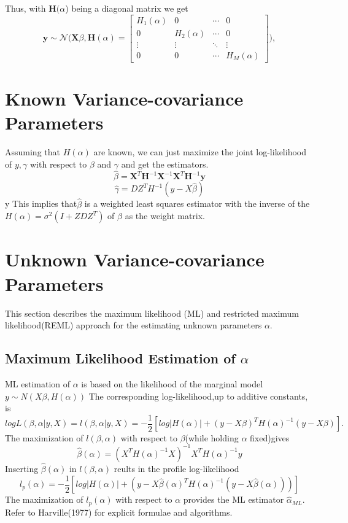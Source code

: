 \documentclass[a4paper,11pt]{article}
\begin{document}
Thus, with $\bm{H}(\alpha$) being a diagonal matrix we get \begin{equation}
	\bm{y}\sim\mathcal{N}\biggl( \bm{X}\beta,\bm{H}(\alpha)= \left[ \begin{array}{cccc}
	H_1(\alpha) & 0 & \cdots & 0 \\
	0 & H_2(\alpha)& \cdots& 0 \\
	\vdots & \vdots & \ddots& \vdots\\
	0 & 0& \cdots & H_M(\alpha) \end{array} \right] \biggr),	
\end{equation}
\section{Known Variance-covariance Parameters}
Assuming that $H(\alpha)$ are known, we can just maximize the joint log-likelihood of $y,\gamma$ with respect to $\beta$ and $\gamma$ and get the estimators.
\begin{equation}
\widehat{\beta}=\bm{X}^T\bm{H}^{-1}\bm{X}^{-1}\bm{X}^T\bm{H}^{-1}\bm{y}
\end{equation}
\begin{equation}
\widehat{\gamma}= DZ^TH^{-1}(y-X\widehat{\beta})
\end{equation}y
This implies that$\widehat{\beta}$ is a weighted least squares estimator with the inverse of the $H(\alpha) = \sigma^2(I+ZDZ^T)$ of $\beta$ as the weight matrix.
\section{Unknown Variance-covariance Parameters}
This section describes the maximum likelihood (ML) and restricted maximum likelihood(REML) approach for the estimating unknown parameters $\alpha$.
\subsection{Maximum Likelihood Estimation of $\alpha$}
ML estimation of $\alpha$ is based on the likelihood of the marginal model $y \sim N(X\beta,H(\alpha))$
The corresponding log-likelihood,up to additive constants, is
\begin{equation}
log L(\beta,\alpha|y,X) =l(\beta,\alpha|y,X) = - \frac{1}{2}[log|H(\alpha)| + (y - X\beta)^TH(\alpha)^{-1}(y - X\beta)].
\end{equation}
The maximization of $l(\beta,\alpha)$ with respect to $\beta$(while holding $\alpha$ fixed)gives
\begin{equation}
\widehat \beta (\alpha) = (X^TH(\alpha)^{-1}X)^{-1}X^TH(\alpha)^{-1}y
\end{equation}
Inserting $\widehat \beta (\alpha)$ in $l(\beta,\alpha)$ reults in the profile log-likelihood
\begin{equation}
l_p(\alpha) = -\frac{1}{2}[log|H(\alpha)| + (y-X\widehat\beta(\alpha)^TH(\alpha)^{-1}(y - X\widehat\beta(\alpha)))]
\end{equation}
The maximization of $l_p(\alpha)$ with respect to $\alpha$ provides the ML estimator $\widehat\alpha_{ML}$.
Refer to Harville(1977) for explicit formulae and algorithms.
\end{document}
